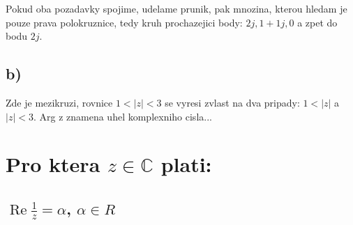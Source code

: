 Pokud oba pozadavky spojime, udelame prunik, pak mnozina, kterou hledam je pouze prava polokruznice, tedy kruh prochazejici body: $2j, 1+1j, 0$ a zpet do bodu $2j$.

\subsection*{b)}
Zde je mezikruzi, rovnice $1 < |z| < 3$ se vyresi zvlast na dva pripady:
$1<|z|$ a $|z|<3$. Arg z znamena uhel komplexniho cisla...

\section{Pro ktera $z \in \mathbb{C}$ plati:}
\subsection*{$\operatorname{Re} \frac{1}{z} = \alpha$, $\alpha \in R$}

